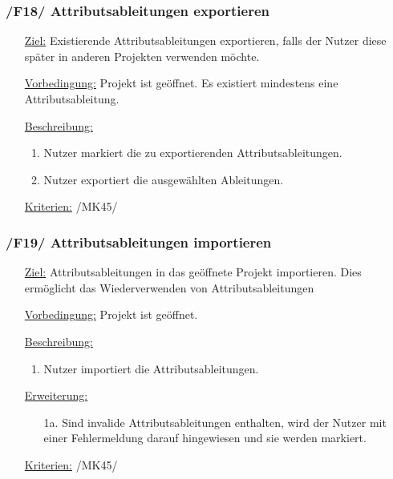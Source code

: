 \documentclass{article}
\begin{document}
\subsubsection*{\textbf{/F18/} Attributsableitungen exportieren} \label{sec:f:Attributsableitungen exportieren}
\begin{itemize}
    \item[\underline{Ziel:}] Existierende Attributsableitungen exportieren, falls der Nutzer diese später in anderen Projekten verwenden möchte.
    \item[\underline{Vorbedingung:}] Projekt ist geöffnet. Es existiert mindestens eine Attributsableitung.
    \item[\underline{Beschreibung:}]
    \begin{enumerate}
        \item Nutzer markiert die zu exportierenden Attributsableitungen.
        \item Nutzer exportiert die ausgewählten Ableitungen. 
    \end{enumerate}
    \item[\underline{Kriterien:}] /MK45/
\end{itemize}

\subsubsection*{\textbf{/F19/} Attributsableitungen importieren}
\label{sec:f:Attributsableitungen importieren}
\begin{itemize}
    \item[\underline{Ziel:}] Attributsableitungen in das geöffnete Projekt importieren. Dies ermöglicht das Wiederverwenden von Attributsableitungen
    \item[\underline{Vorbedingung:}] Projekt ist geöffnet.
    \item[\underline{Beschreibung:}]
    \begin{enumerate}
        \item Nutzer importiert die Attributsableitungen. 
    \end{enumerate}
    \item[\underline{Erweiterung:}]
    \begin{itemize}
        \item[1a.] Sind invalide Attributsableitungen enthalten, wird der Nutzer mit einer Fehlermeldung darauf hingewiesen und sie werden markiert. 
    \end{itemize}
    \item[\underline{Kriterien:}] /MK45/
\end{itemize}
\end{document}
